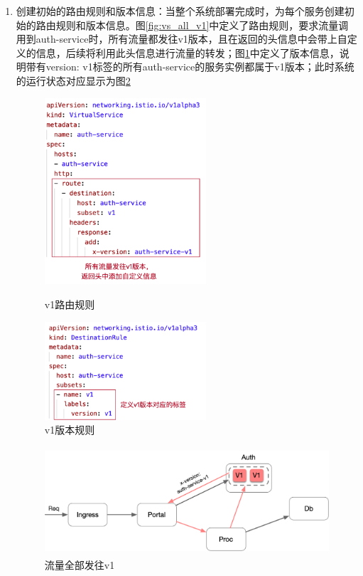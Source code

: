 \documentclass[12pt,a4paper]{article}
\theoremstyle{definition}
\begin{document}
\begin{enumerate}
	\item [1.] 创建初始的路由规则和版本信息：当整个系统部署完成时，为每个服务创建初始的路由规则和版本信息。图\ref{fig:vs_all_v1}中定义了路由规则，要求流量调用到auth-service时，所有流量都发往v1版本，且在返回的头信息中会带上自定义的信息，后续将利用此头信息进行流量的转发；图\ref{fig:dr_v1}中定义了版本信息，说明带有{version: v1}标签的所有auth-service的服务实例都属于v1版本；此时系统的运行状态对应显示为图\ref{fig:traffic_all_v1}
	\begin{figure}[htbp]
	\centering
	\begin{minipage}[t]{0.48\textwidth}
	\centering
	\centerline{\includegraphics[width=6cm]{vs_all_v1.png}}
	\caption{v1路由规则}
	\label{fig:vs_all_v1}
	\end{minipage}
	\begin{minipage}[t]{0.48\textwidth}
	\centering
	\centerline{\includegraphics[width=6cm]{dr_v1.png}}
	\caption{v1版本规则}
	\label{fig:dr_v1}
	\end{minipage}
	\end{figure}

	\begin{figure}[ht]
	 \centering
	 \includegraphics[height=4cm]{images/traffic_all_v1.png}
	 \caption{流量全部发往v1}
	 \label{fig:traffic_all_v1}
	\end{figure}


\end{enumerate}
\end{document}
